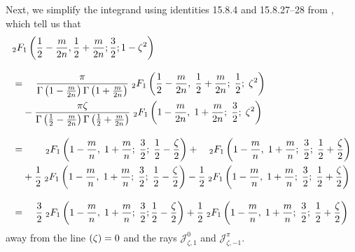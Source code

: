 \documentclass{article}
\let\Re\relax
\DeclareMathOperator{\Re}{Re}
\theoremstyle{definition}
\theoremstyle{plain}
\begin{document}
Next, we simplify the integrand using identities 15.8.4 and 15.8.27--28 from \cite{dlmf}, which tell us that\begin{align*}
&{}_2F_1\left(\frac{1}{2} - \frac{m}{2n}, \frac{1}{2} + \frac{m}{2n}; \frac{3}{2}; 1 - \zeta^2\right) \\[3mm]
& =\; \hphantom{+} \frac{\pi}{\Gamma\left(1-\frac{m}{2n}\right) \Gamma\left(1 + \frac{m}{2n}\right)}\;{}_2F_1\left(\frac{1}{2} - \frac{m}{2n},\;\frac{1}{2} + \frac{m}{2n};\;\frac{1}{2};\;\zeta^2\right) \\
& \hphantom{=}\; - \frac{\pi \zeta}{\Gamma\left(\frac{1}{2} - \frac{m}{2n}\right) \Gamma\left(\frac{1}{2} + \frac{m}{2n}\right)}\;{}_2F_1\left(1 - \frac{m}{2n},\;1 + \frac{m}{2n};\;\frac{3}{2};\;\zeta^2\right) \\[3mm]
& =\; \hphantom{+ \frac{0}{0}}\;{}_2F_1\left(1 - \frac{m}{n},\;1 + \frac{m}{n};\;\frac{3}{2};\;\frac{1}{2} - \frac{\zeta}{2}\right) + \hphantom{\frac{0}{0}}\;{}_2F_1\left(1-\frac{m}{n},\;1 + \frac{m}{n};\;\frac{3}{2};\;\frac{1}{2} + \frac{\zeta}{2}\right) \\
& \hphantom{=}\; + \frac{1}{2}\;{}_2F_1\left(1-\frac{m}{n},\;1+\frac{m}{n};\;\frac{3}{2};\;\frac{1}{2} - \frac{\zeta}{2}\right) - \frac{1}{2}\;{}_2F_1\left(1-\frac{m}{n},\;1 + \frac{m}{n};\;\frac{3}{2};\;\frac{1}{2} + \frac{\zeta}{2}\right) \\[3mm]
& =\; \hphantom{+} \frac{3}{2}\;{}_2F_1\left(1 - \frac{m}{n},\;1 + \frac{m}{n};\;\frac{3}{2};\frac{1}{2} - \frac{\zeta}{2}\right) + \frac{1}{2}\;{}_2F_1\left(1 - \frac{m}{n},\;1 + \frac{m}{n};\;\frac{3}{2};\;\frac{1}{2} + \frac{\zeta}{2}\right)
\end{align*}
away from the line $\Re(\zeta) = 0$ and the rays $\mathcal{J}^0_{\zeta,1}$ and $\mathcal{J}^\pi_{\zeta,-1}$.
\end{document}

